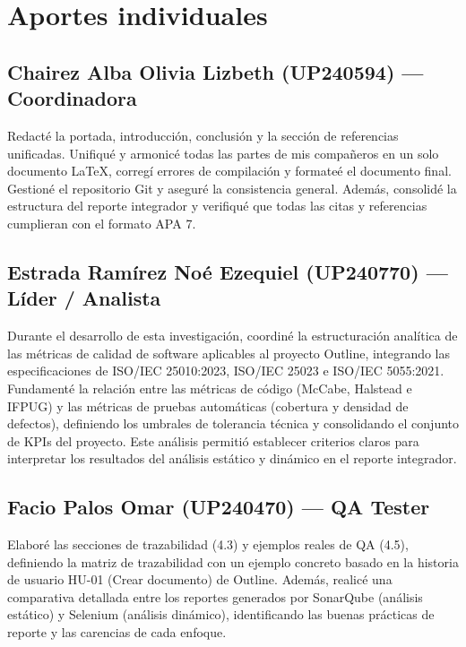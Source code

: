 \documentclass[12pt, letterpaper]{article}
\begin{document}
\section{Aportes individuales}

\subsection*{Chairez Alba Olivia Lizbeth (UP240594) — Coordinadora}

Redacté la portada, introducción, conclusión y la sección de referencias unificadas. Unifiqué y armonicé todas las partes de mis compañeros en un solo documento LaTeX, corregí errores de compilación y formateé el documento final. Gestioné el repositorio Git y aseguré la consistencia general. Además, consolidé la estructura del reporte integrador y verifiqué que todas las citas y referencias cumplieran con el formato APA 7.

\subsection*{Estrada Ramírez Noé Ezequiel (UP240770) — Líder / Analista}

Durante el desarrollo de esta investigación, coordiné la estructuración analítica de las métricas de calidad de software aplicables al proyecto Outline, integrando las especificaciones de ISO/IEC 25010:2023, ISO/IEC 25023 e ISO/IEC 5055:2021. Fundamenté la relación entre las métricas de código (McCabe, Halstead e IFPUG) y las métricas de pruebas automáticas (cobertura y densidad de defectos), definiendo los umbrales de tolerancia técnica y consolidando el conjunto de KPIs del proyecto. Este análisis permitió establecer criterios claros para interpretar los resultados del análisis estático y dinámico en el reporte integrador.

\subsection*{Facio Palos Omar (UP240470) — QA Tester}

Elaboré las secciones de trazabilidad (4.3) y ejemplos reales de QA (4.5), definiendo la matriz de trazabilidad con un ejemplo concreto basado en la historia de usuario HU-01 (Crear documento) de Outline. Además, realicé una comparativa detallada entre los reportes generados por SonarQube (análisis estático) y Selenium (análisis dinámico), identificando las buenas prácticas de reporte y las carencias de cada enfoque.
\end{document}
